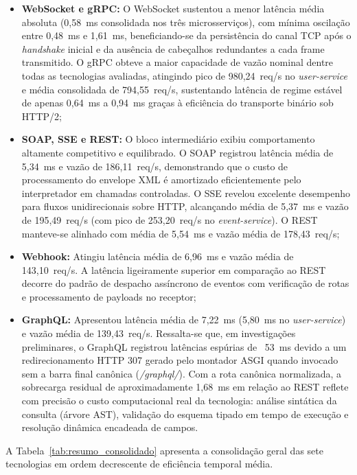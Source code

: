 \documentclass[a4paper,12pt]{article}
\begin{document}
\begin{itemize}
    \item \textbf{WebSocket e gRPC:} O WebSocket sustentou a menor latência média absoluta (0,58~ms consolidada nos três microsserviços), com mínima oscilação entre 0,48~ms e 1,61~ms, beneficiando-se da persistência do canal TCP após o \textit{handshake} inicial e da ausência de cabeçalhos redundantes a cada frame transmitido. O gRPC obteve a maior capacidade de vazão nominal dentre todas as tecnologias avaliadas, atingindo pico de 980,24~req/s no \textit{user-service} e média consolidada de 794,55~req/s, sustentando latência de regime estável de apenas 0,64~ms a 0,94~ms graças à eficiência do transporte binário sob HTTP/2;
    \item \textbf{SOAP, SSE e REST:} O bloco intermediário exibiu comportamento altamente competitivo e equilibrado. O SOAP registrou latência média de 5,34~ms e vazão de 186,11~req/s, demonstrando que o custo de processamento do envelope XML é amortizado eficientemente pelo interpretador em chamadas controladas. O SSE revelou excelente desempenho para fluxos unidirecionais sobre HTTP, alcançando média de 5,37~ms e vazão de 195,49~req/s (com pico de 253,20~req/s no \textit{event-service}). O REST manteve-se alinhado com média de 5,54~ms e vazão média de 178,43~req/s;
    \item \textbf{Webhook:} Atingiu latência média de 6,96~ms e vazão média de 143,10~req/s. A latência ligeiramente superior em comparação ao REST decorre do padrão de despacho assíncrono de eventos com verificação de rotas e processamento de payloads no receptor;
    \item \textbf{GraphQL:} Apresentou latência média de 7,22~ms (5,80~ms no \textit{user-service}) e vazão média de 139,43~req/s. Ressalta-se que, em investigações preliminares, o GraphQL registrou latências espúrias de ~53~ms devido a um redirecionamento HTTP 307 gerado pelo montador ASGI quando invocado sem a barra final canônica (\textit{/graphql/}). Com a rota canônica normalizada, a sobrecarga residual de aproximadamente 1,68~ms em relação ao REST reflete com precisão o custo computacional real da tecnologia: análise sintática da consulta (árvore AST), validação do esquema tipado em tempo de execução e resolução dinâmica encadeada de campos.
\end{itemize}

A Tabela~\ref{tab:resumo_consolidado} apresenta a consolidação geral das sete tecnologias em ordem decrescente de eficiência temporal média.
\end{document}
